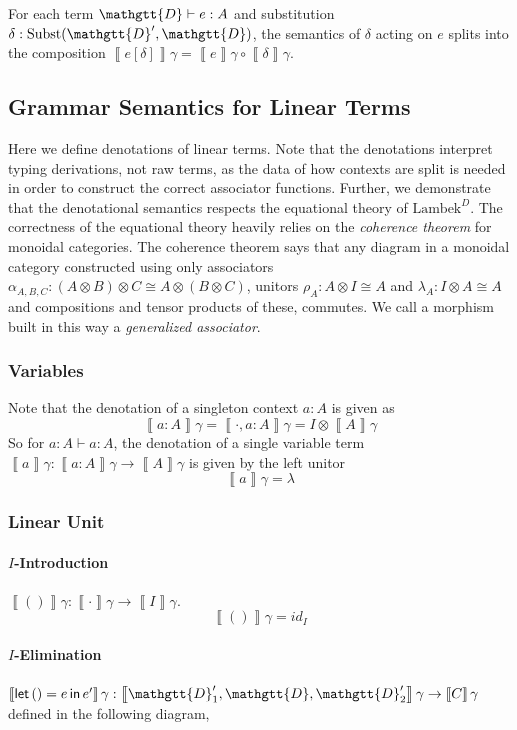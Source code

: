 \documentclass[acmsmall,nonacm]{acmart}
\renewcommand{\Delta}{\mathgtt{D}}
\newcommand{\sem}[1]{\left\llbracket{#1}\right\rrbracket}
\newcommand{\semg}[1]{\sem{#1}\gamma}
\newcommand{\theoryabbv}{$\textrm{Lambek}^D$\xspace}
\newcommand{\letin}[3]{\mathsf{let}\, #1 = #2 \, \mathsf{in}\, #3}
\begin{document}
\begin{lemma}
  \label{lem:subst}
  For each term $\Delta \vdash e : A$ and substitution
  $\delta : \textrm{Subst}(\Delta', \Delta)$, the semantics of $\delta$ acting
  on $e$ splits into the composition $\semg{e[\delta]} = \semg{e} \circ \semg{\delta}$.
\end{lemma}

\subsection{Grammar Semantics for Linear Terms}
Here we define denotations of linear terms. Note that the denotations
interpret typing derivations, not raw terms, as the data of how
contexts are split is needed in order to construct the correct
associator functions. Further, we demonstrate that the denotational
semantics respects the equational theory of \theoryabbv. The
correctness of the equational theory heavily relies on the
\emph{coherence theorem} for monoidal categories. The coherence
theorem says that any diagram in a monoidal category constructed using
only associators $\alpha_{A,B,C} : (A \otimes B) \otimes C \cong A
\otimes (B \otimes C)$, unitors $\rho_A : A \otimes I \cong A$ and
$\lambda_A : I \otimes A \cong A$ and compositions and tensor products
of these, commutes. We call a morphism built in this way a
\emph{generalized associator}.

\subsubsection{Variables}
Note that the denotation of a singleton context $a : A$ is given as
\[
  \semg{a : A} = \semg{\cdot , a : A} = I \otimes \semg{A}
\]
So for $a: A \vdash a : A$, the denotation of a single variable term
$\semg{a} : \semg{a : A} \to \semg{A}$ is given by the left unitor
\[
  \semg{a} = \lambda
\]

\subsubsection{Linear Unit}
\paragraph{$I$-Introduction}
$\semg{()} : \semg{\cdot} \to \semg{I}$.
\[
\semg{()} = id_{I}
\]

\paragraph{$I$-Elimination}
$\semg{\letin {()} e e'} : \semg{\Delta'_{1},\Delta,\Delta'_{2}} \to \semg{C}$
defined in the following diagram,
\end{document}
